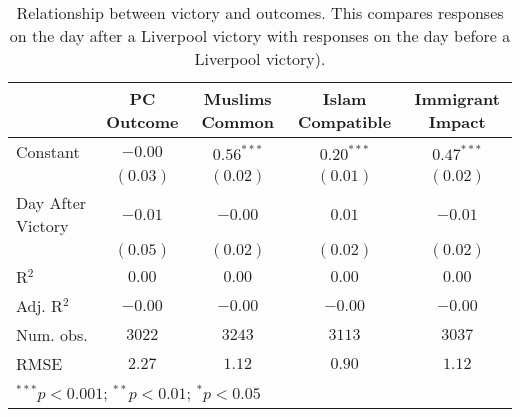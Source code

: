 
\begin{table}[H]
\begin{center}
\begin{footnotesize}
\begin{tabular}{l c c c c}
\hline
 & PC Outcome & Muslims Common & Islam Compatible & Immigrant Impact \\
\hline
Constant          & $-0.00$  & $0.56^{***}$ & $0.20^{***}$ & $0.47^{***}$ \\
                  & $(0.03)$ & $(0.02)$     & $(0.01)$     & $(0.02)$     \\
Day After
Victory & $-0.01$  & $-0.00$      & $0.01$       & $-0.01$      \\
                  & $(0.05)$ & $(0.02)$     & $(0.02)$     & $(0.02)$     \\
\hline
R$^2$             & $0.00$   & $0.00$       & $0.00$       & $0.00$       \\
Adj. R$^2$        & $-0.00$  & $-0.00$      & $-0.00$      & $-0.00$      \\
Num. obs.         & $3022$   & $3243$       & $3113$       & $3037$       \\
RMSE              & $2.27$   & $1.12$       & $0.90$       & $1.12$       \\
\hline
\multicolumn{5}{l}{\tiny{$^{***}p<0.001$; $^{**}p<0.01$; $^{*}p<0.05$}}
\end{tabular}
\end{footnotesize}
\caption{Relationship between victory and outcomes. This compares responses on the day after a Liverpool victory 
       with responses on the day before a Liverpool victory).}
\label{tab:fb_victory1}
\end{center}
\end{table}
